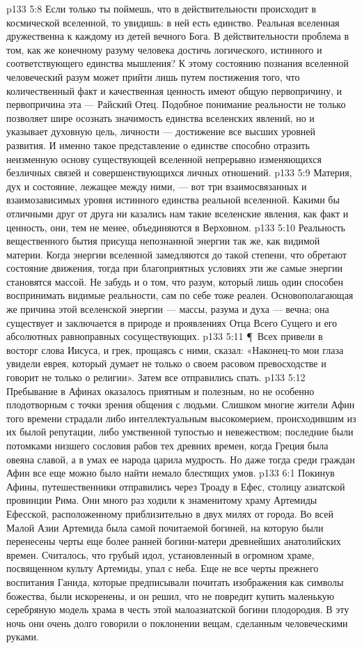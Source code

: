 \vs p133 5:8 Если только ты поймешь, что в действительности происходит в космической вселенной, то увидишь: в ней есть единство. Реальная вселенная дружественна к каждому из детей вечного Бога. В действительности проблема в том, как же конечному разуму человека достичь логического, истинного и соответствующего единства мышления? К этому состоянию познания вселенной человеческий разум может прийти лишь путем постижения того, что количественный факт и качественная ценность имеют общую первопричину, и первопричина эта --- Райский Отец. Подобное понимание реальности не только позволяет шире осознать значимость единства вселенских явлений, но и указывает духовную цель, личности --- достижение все высших уровней развития. И именно такое представление о единстве способно отразить неизменную основу существующей вселенной непрерывно изменяющихся безличных связей и совершенствующихся личных отношений.
\vs p133 5:9 Материя, дух и состояние, лежащее между ними, --- вот три взаимосвязанных и взаимозависимых уровня истинного единства реальной вселенной. Какими бы отличными друг от друга ни казались нам такие вселенские явления, как факт и ценность, они, тем не менее, объединяются в Верховном.
\vs p133 5:10 Реальность вещественного бытия присуща непознанной энергии так же, как видимой материи. Когда энергии вселенной замедляются до такой степени, что обретают состояние движения, тогда при благоприятных условиях эти же самые энергии становятся массой. Не забудь и о том, что разум, который лишь один способен воспринимать видимые реальности, сам по себе тоже реален. Основополагающая же причина этой вселенской энергии --- массы, разума и духа --- вечна; она существует и заключается в природе и проявлениях Отца Всего Сущего и его абсолютных равноправных сосуществующих.
\vs p133 5:11 \P\ Всех привели в восторг слова Иисуса, и грек, прощаясь с ними, сказал: «Наконец\hyp{}то мои глаза увидели еврея, который думает не только о своем расовом превосходстве и говорит не только о религии». Затем все отправились спать.
\vs p133 5:12 Пребывание в Афинах оказалось приятным и полезным, но не особенно плодотворным с точки зрения общения с людьми. Слишком многие жители Афин того времени страдали либо интеллектуальным высокомерием, происходившим из их былой репутации, либо умственной тупостью и невежеством; последние были потомками низшего сословия рабов тех древних времен, когда Греция была овеяна славой, а в умах ее народа царила мудрость. Но даже тогда среди граждан Афин все еще можно было найти немало блестящих умов.
\vs p133 6:1 Покинув Афины, путешественники отправились через Троаду в Ефес, столицу азиатской провинции Рима. Они много раз ходили к знаменитому храму Артемиды Ефесской, расположенному приблизительно в двух милях от города. Во всей Малой Азии Артемида была самой почитаемой богиней, на которую были перенесены черты еще более ранней богини\hyp{}матери древнейших анатолийских времен. Считалось, что грубый идол, установленный в огромном храме, посвященном культу Артемиды, упал с неба. Еще не все черты прежнего воспитания Ганида, которые предписывали почитать изображения как символы божества, были искоренены, и он решил, что не повредит купить маленькую серебряную модель храма в честь этой малоазиатской богини плодородия. В эту ночь они очень долго говорили о поклонении вещам, сделанным человеческими руками.

